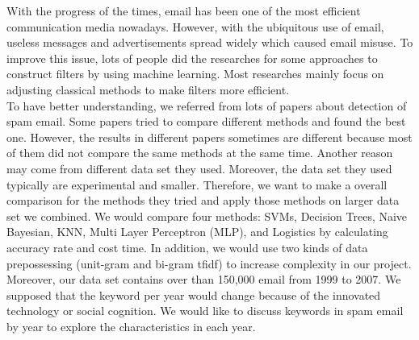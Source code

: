 
With the progress of the times, email has been one of the most efficient communication media nowadays. However, with the ubiquitous use of email, useless messages and advertisements spread widely which caused email misuse. To improve this issue, lots of people did the researches for some approaches to construct filters by using machine learning. Most researches mainly focus on adjusting classical methods to make filters more efficient.\\

To have better understanding, we referred from lots of papers about detection of spam email. Some papers tried to compare different methods and found the best one. However, the results in different papers sometimes are different because most of them did not compare the same methods at the same time. Another reason may come from different data set they used. Moreover, the data set they used typically are experimental and smaller. Therefore, we want to make a overall comparison for the methods they tried and apply those methods on larger data set we combined. We would compare four methods: SVMs, Decision Trees, Naive Bayesian, KNN, Multi Layer Perceptron (MLP), and Logistics by calculating accuracy rate and cost time. In addition, we would use two kinds of data prepossessing (unit-gram and bi-gram tfidf) to increase complexity in our project.\\

Moreover, our data set contains over than 150,000 email from 1999 to 2007. We supposed that the keyword per year would change because of the innovated technology or social cognition. We would like to discuss keywords in spam email by year to explore the characteristics in each year.


